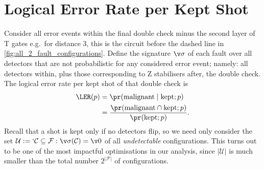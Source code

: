 \section{Logical Error Rate per Kept Shot}
\label{sec:logical_error_rate_per_kept_shot}
Consider all error events within
the final double check minus the second layer of T gates
e.g.\ for distance 3, this is the circuit before the dashed line in
\cref{fig:all_2_fault_configurations}.
Define the signature $\v \sigma$ of each fault over all detectors
that are not probabilistic for any considered error event;
namely:
	all detectors within,
	plus those corresponding to Z stabilisers after,
the double check.
The logical error rate per kept shot of that double check is
\begin{align}
\LER(p)
&=\pr(\text{malignant} \mid \text{kept}; p) \notag \\
&=\frac{\pr(\text{malignant} \cap \text{kept}; p)}{\pr(\text{kept}; p)}.
\end{align}
Recall that a shot is kept only if no detectors flip,
so we need only consider the set $\mathcal{U}
:=`{\mathcal{C} \subseteq \mathcal{F}: \v\sigma(\mathcal{C}) =\v 0}$
of all \emph{undetectable} configurations.
This turns out to be one of the most impactful optimisations in our analysis,
since $|\mathcal{U}|$ is much smaller than the total number $2^{|\mathcal F|}$ of configurations.

